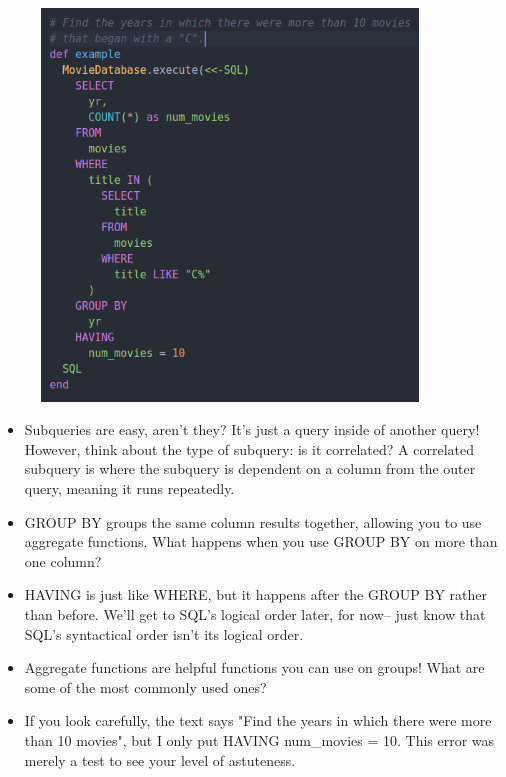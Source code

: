\documentclass{42-en}
\begin{document}
            \begin{figure}[H]
                \begin{center}
                    \includegraphics[width=10cm]{subquery.png}
                \end{center}
            \end{figure}

	\begin{itemize}\itemsep1pt 
		\item Subqueries are easy, aren't they? It's just a query inside of another query! 
			However, think about the type of subquery: is it correlated? A correlated 
			subquery is where the subquery is dependent on a column from the outer query, 
			meaning it runs repeatedly. 
		\item GROUP BY groups the same column results together, allowing you to use aggregate functions. 
			What happens when you use GROUP BY on more than one column? 
		\item HAVING is just like WHERE, but it happens after the GROUP BY rather than before. 
			We'll get to SQL's logical order 
			later, for now-- just know that SQL's syntactical order isn't its logical order. 
		\item Aggregate functions are helpful functions you can use on groups! What are some of the most 
			commonly used ones?
		\item If you look carefully, the text says "Find the years in which there were more than 10 movies", 
			but I only put HAVING num\_movies = 10. This error was merely a test to see your 
			level of astuteness. 
	\end{itemize}
\end{document}
